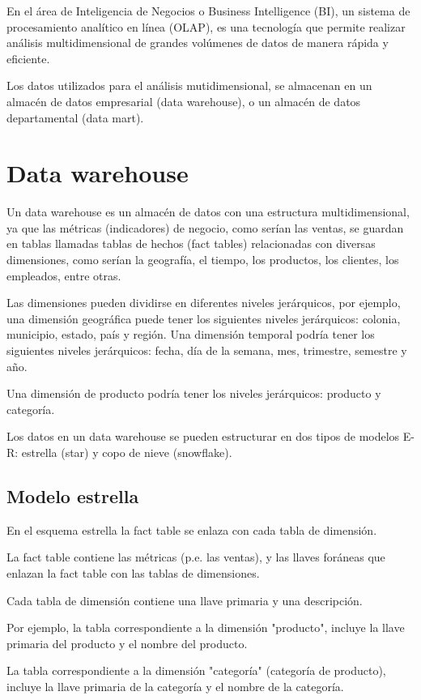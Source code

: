 En el área de Inteligencia de Negocios o Business Intelligence (BI), un sistema de procesamiento analítico en línea (OLAP), es una tecnología que permite realizar análisis multidimensional de grandes volúmenes de datos de manera rápida y eficiente.

Los datos utilizados para el análisis mutidimensional, se almacenan en un almacén de datos empresarial (data warehouse), o un almacén de datos departamental (data mart).

\section{Data warehouse}

Un data warehouse es un almacén de datos con una estructura multidimensional, ya que las métricas (indicadores) de negocio, como serían las ventas, se guardan en tablas llamadas tablas de hechos (fact tables) relacionadas con diversas dimensiones, como serían la geografía, el tiempo, los productos, los clientes, los empleados, entre otras.

Las dimensiones pueden dividirse en diferentes niveles jerárquicos, por ejemplo, una dimensión geográfica puede tener los siguientes niveles jerárquicos: colonia, municipio, estado, país y región. Una dimensión temporal podría tener los siguientes niveles jerárquicos: fecha, día de la semana, mes, trimestre, semestre y año.

Una dimensión de producto podría tener los niveles jerárquicos: producto y categoría.

Los datos en un data warehouse se pueden estructurar en dos tipos de modelos E-R: estrella (star) y copo de nieve (snowflake).

\subsection{Modelo estrella}

En el esquema estrella la fact table se enlaza con cada tabla de dimensión.

La fact table contiene las métricas (p.e. las ventas), y las llaves foráneas que enlazan la fact table con las tablas de dimensiones.

Cada tabla de dimensión contiene una llave primaria y una descripción.

Por ejemplo, la tabla correspondiente a la dimensión "producto", incluye la llave primaria del producto y el nombre del producto.

La tabla correspondiente a la dimensión "categoría" (categoría de producto), incluye la llave primaria de la categoría y el nombre de la categoría.


